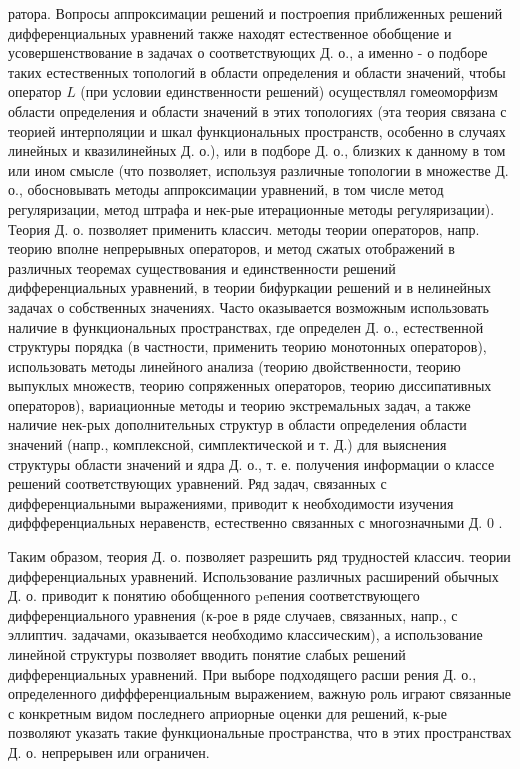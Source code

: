 \documentclass[10pt]{article}
\begin{document}
ратора. Вопросы аппроксимации решений и построепия приближенных решений дифференциальных уравнений также находят естественное обобщение и усовершенствование в задачах о соответствующих Д. о., а именно - о подборе таких естественных топологий в области определения и области значений, чтобы оператор $L$ (при условии единственности решений) осуществлял гомеоморфизм области определения и области значений в этих топологиях (эта теория связана с теорией интерполяции и шкал функциональных пространств, особенно в случаях линейных и квазилинейных Д. о.), или в подборе Д. о., близких к данному в том или ином смысле (что позволяет, используя различные топологии в множестве Д. о., обосновывать методы аппроксимации уравнений, в том числе метод регуляризации, метод штрафа и нек-рые итерационные методы регуляризации). Теория Д. о. позволяет применить классич. методы теории операторов, напр. теорию вполне непрерывных операторов, и метод сжатых отображений в различных теоремах существования и единственности решений дифференциальных уравнений, в теории бифуркации решений и в нелинейных задачах о собственных значениях. Часто оказывается возможным использовать наличие в функциональных пространствах, где определен Д. о., естественной структуры порядка (в частности, применить теорию монотонных операторов), использовать методы линейного анализа (теорию двойственности, теорию выпуклых множеств, теорию сопряженных операторов, теорию диссипативных операторов), вариационные методы и теорию экстремальных задач, а также наличие нек-рых дополнительных структур в области определения области значений (напр., комплексной, симплектической и т. Д.) для выяснения структуры области значений и ядра Д. о., т. е. получения информации о классе решений соответствующих уравнений. Ряд задач, связанных с дифференциальными выражениями, приводит к необходимости изучения диффференциальных неравенств, естественно связанных с многозначными Д. 0 .



Таким образом, теория Д. о. позволяет разрешить ряд трудностей классич. теории дифференциальных уравнений. Использование различных расширений обычных Д. о. приводит к понятию обобщенного peпения соответствующего дифференциального уравнения (к-рое в ряде случаев, связанных, напр., с эллиптич. задачами, оказывается необходимо классическим), а использование линейной структуры позволяет вводить понятие слабых решений дифференциальных уравнений. При выборе подходящего расши рения Д. о., определенного диффференциальным выражением, важную роль играют связанные с конкретным видом последнего априорные оценки для решений, к-рые позволяют указать такие функциональные пространства, что в этих пространствах Д. о. непрерывен или ограничен.
\end{document}
